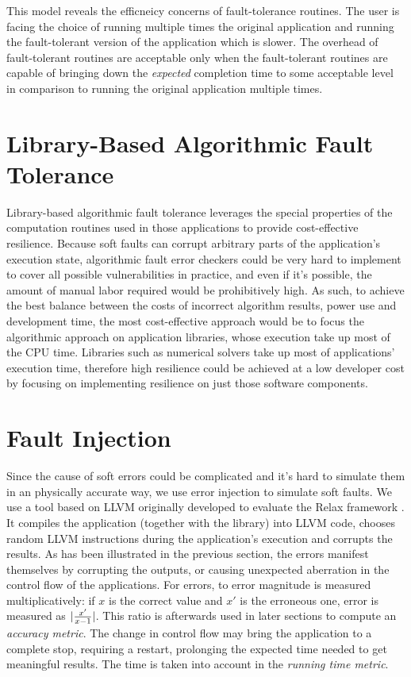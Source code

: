 \documentclass{article}
\begin{document}
This model reveals the efficneicy concerns of fault-tolerance routines. The user is facing the choice of running multiple times the original application and running the fault-tolerant version of the application which is slower. The overhead of fault-tolerant routines are acceptable only when the fault-tolerant routines are capable of bringing down the \emph{expected} completion time to some acceptable level in comparison to running the original application multiple times.

\section{Library-Based Algorithmic Fault Tolerance}

Library-based algorithmic fault tolerance leverages the special properties of the computation routines used in those applications to provide cost-effective resilience. Because soft faults can corrupt arbitrary parts of the application's execution state, algorithmic fault error checkers could be very hard to implement to cover all possible vulnerabilities in practice, and even if it's possible, the amount of manual labor required would be prohibitively high. As such, to achieve the best balance between the costs of incorrect algorithm results, power use and development time, the most cost-effective approach would be to focus the algorithmic approach on application libraries, whose execution take up most of the CPU time. Libraries such as numerical solvers take up most of applications' execution time, therefore high resilience could be achieved at a low developer cost by focusing on implementing resilience on just those software components.

\section{Fault Injection}

Since the cause of soft errors could be complicated and it's hard to simulate them in an physically accurate way, we use error injection to simulate soft faults. We use a tool based on LLVM originally developed to evaluate the Relax framework \cite{deKruijf:2010:RAF:1816038.1816026} . It compiles the application (together with the library) into LLVM code, chooses random LLVM instructions during the application's execution and corrupts the results. As has been illustrated in the previous section, the errors manifest themselves by corrupting the outputs, or causing unexpected aberration in the control flow of the applications. For errors, to error magnitude is measured multiplicatively: if $x$ is the correct value and $x'$ is the erroneous one, error is measured as $|{x' \over x - 1}|$. This ratio is afterwards used in later sections to compute an \emph{accuracy metric}. The change in control flow may bring the application to a complete stop, requiring a restart, prolonging the expected time needed to get meaningful results. The time is taken into account in the \emph{running time metric}.
\end{document}
